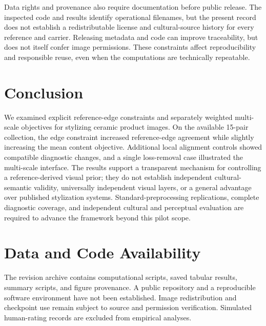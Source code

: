 \documentclass[manuscript,acmlarge,screen,review]{acmart}
\begin{document}
Data rights and provenance also require documentation before public release. The inspected code and results identify operational filenames, but the present record does not establish a redistributable license and cultural-source history for every reference and carrier. Releasing metadata and code can improve traceability, but does not itself confer image permissions. These constraints affect reproducibility and responsible reuse, even when the computations are technically repeatable.

\section{Conclusion}
\label{sec:conclusion}
We examined explicit reference-edge constraints and separately weighted multi-scale objectives for stylizing ceramic product images. On the available 15-pair collection, the edge constraint increased reference-edge agreement while slightly increasing the mean content objective. Additional local alignment controls showed compatible diagnostic changes, and a single loss-removal case illustrated the multi-scale interface. The results support a transparent mechanism for controlling a reference-derived visual prior; they do not establish independent cultural-semantic validity, universally independent visual layers, or a general advantage over published stylization systems. Standard-preprocessing replications, complete diagnostic coverage, and independent cultural and perceptual evaluation are required to advance the framework beyond this pilot scope.

\section*{Data and Code Availability}
The revision archive contains computational scripts, saved tabular results, summary scripts, and figure provenance. A public repository and a reproducible software environment have not been established. Image redistribution and checkpoint use remain subject to source and permission verification. Simulated human-rating records are excluded from empirical analyses.

\appendix
\end{document}
